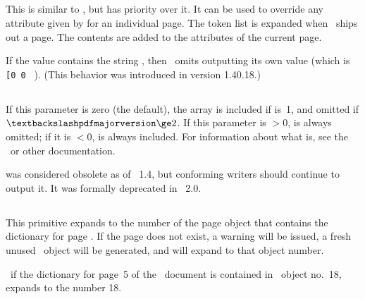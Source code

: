 \documentclass{pdftexmanual}
\begin{document}
\subsection{}

This is similar to , but has priority over it.
It can be used to override any attribute given by 
for an individual page. The token list is expanded when \PDFTEX\ ships out
a page. The contents are added to the attributes of the current page.

If the  value contains the string ,
then \PDFTEX\ omits outputting its own  value (which is
\verb|[0 0 | \type{]}).  (This behavior was introduced in version
1.40.18.)

\subsection{}

If this parameter is zero (the default), the  array is
included if  is~1, and omitted if
$\cs{pdfmajorversion}\ge2$. If this parameter is $>0$, 
is always omitted; if it is $<0$,  is always
included. For information about what  is, see the
\PDFReference\ or other documentation.

 was considered obsolete as of \PDF~1.4, but conforming
writers should continue to output it. It was formally deprecated in
\PDF~2.0.

\subsection{}

This primitive expands to the number of the page object that contains
the dictionary for page . If the page
 does not exist, a warning will be issued,
a fresh unused \PDF\ object will be generated, and 
will expand to that object number.

\Eg\ if the dictionary for page~5 of the \TEX\ document is contained in
\PDF\ object no.~18,  expands to the number 18.
\end{document}
